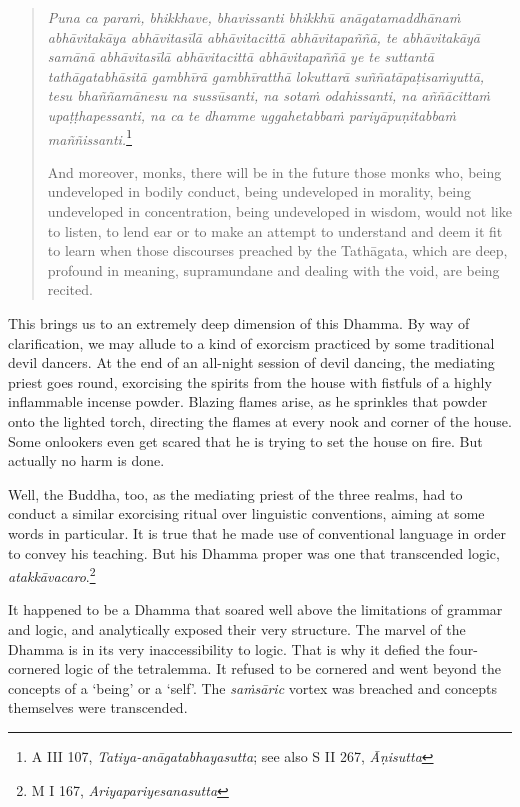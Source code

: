 \begin{quote}
\emph{Puna ca paraṁ, bhikkhave, bhavissanti bhikkhū anāgatamaddhānaṁ abhāvitakāya abhāvitasīlā abhāvitacittā abhāvitapaññā, te abhāvitakāyā samānā abhāvitasīlā abhāvitacittā abhāvitapaññā ye te suttantā tathāgatabhāsitā gambhīrā gambhīratthā lokuttarā suññatāpaṭisaṁyuttā, tesu bhaññamānesu na sussūsanti, na sotaṁ odahissanti, na aññācittaṁ upaṭṭhapessanti, na ca te dhamme uggahetabbaṁ pariyāpuṇitabbaṁ maññissanti.}\footnote{A III 107, \emph{Tatiya-anāgatabhayasutta}; see also S II 267, \emph{Āṇisutta}}

And moreover, monks, there will be in the future those monks who, being undeveloped in bodily conduct, being undeveloped in morality, being undeveloped in concentration, being undeveloped in wisdom, would not like to listen, to lend ear or to make an attempt to understand and deem it fit to learn when those discourses preached by the Tathāgata, which are deep, profound in meaning, supramundane and dealing with the void, are being recited.
\end{quote}

This brings us to an extremely deep dimension of this Dhamma. By way of clarification, we may allude to a kind of exorcism practiced by some traditional devil dancers. At the end of an all-night session of devil dancing, the mediating priest goes round, exorcising the spirits from the house with fistfuls of a highly inflammable incense powder. Blazing flames arise, as he sprinkles that powder onto the lighted torch, directing the flames at every nook and corner of the house. Some onlookers even get scared that he is trying to set the house on fire. But actually no harm is done.

Well, the Buddha, too, as the mediating priest of the three realms, had to conduct a similar exorcising ritual over linguistic conventions, aiming at some words in particular. It is true that he made use of conventional language in order to convey his teaching. But his Dhamma proper was one that transcended logic, \emph{atakkāvacaro}.\footnote{M I 167, \emph{Ariyapariyesanasutta}}

It happened to be a Dhamma that soared well above the limitations of grammar and logic, and analytically exposed their very structure. The marvel of the Dhamma is in its very inaccessibility to logic. That is why it defied the four-cornered logic of the tetralemma. It refused to be cornered and went beyond the concepts of a `being' or a `self'. The \emph{saṁsāric} vortex was breached and concepts themselves were transcended.

